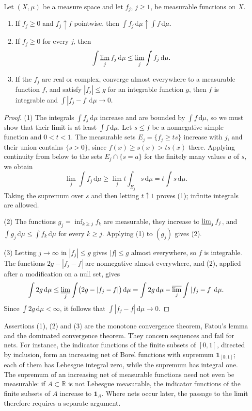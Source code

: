 \begin{proposition}\label{prop:integral-limits}
Let $(X,\mu)$ be a measure space and let $f_j$, $j\geq1$, be measurable functions on $X$.
\begin{enumerate}
\item If $f_j\geq0$ and $f_j\uparrow f$ pointwise, then $\int f_j\,\mathrm d\mu\uparrow\int f\,\mathrm d\mu$.
\item If $f_j\geq0$ for every $j$, then
\[
 \int\varliminf_j f_j\,\mathrm d\mu\leq\varliminf_j\int f_j\,\mathrm d\mu.
\]
\item If the $f_j$ are real or complex, converge almost everywhere to a measurable function $f$, and satisfy $|f_j|\leq g$ for an integrable function $g$, then $f$ is integrable and $\int|f_j-f|\,\mathrm d\mu\to0$.
\end{enumerate}
\end{proposition}
\begin{proof}
(1) The integrals $\int f_j\,\mathrm d\mu$ increase and are bounded by $\int f\,\mathrm d\mu$, so we must show that their limit is at least $\int f\,\mathrm d\mu$. Let $s\leq f$ be a nonnegative simple function and $0<t<1$. The measurable sets $E_j=\{f_j\geq ts\}$ increase with $j$, and their union contains $\{s>0\}$, since $f(x)\geq s(x)>ts(x)$ there. Applying continuity from below to the sets $E_j\cap\{s=a\}$ for the finitely many values $a$ of $s$, we obtain
\[
 \lim_j\int f_j\,\mathrm d\mu\geq\lim_jt\int_{E_j}s\,\mathrm d\mu=t\int s\,\mathrm d\mu.
\]
Taking the supremum over $s$ and then letting $t\uparrow1$ proves (1); infinite integrals are allowed.

(2) The functions $g_j=\inf_{k\geq j}f_k$ are measurable, they increase to $\varliminf_jf_j$, and $\int g_j\,\mathrm d\mu\leq\int f_k\,\mathrm d\mu$ for every $k\geq j$. Applying (1) to $(g_j)$ gives (2).

(3) Letting $j\to\infty$ in $|f_j|\leq g$ gives $|f|\leq g$ almost everywhere, so $f$ is integrable. The functions $2g-|f_j-f|$ are nonnegative almost everywhere, and (2), applied after a modification on a null set, gives
\[
 \int2g\,\mathrm d\mu\leq\varliminf_j\int\bigl(2g-|f_j-f|\bigr)\,\mathrm d\mu=\int2g\,\mathrm d\mu-\varlimsup_j\int|f_j-f|\,\mathrm d\mu.
\]
Since $\int2g\,\mathrm d\mu<\infty$, it follows that $\int|f_j-f|\,\mathrm d\mu\to0$.
\end{proof}

Assertions (1), (2) and (3) are the monotone convergence theorem, Fatou's lemma and the dominated convergence theorem. They concern sequences and fail for nets. For instance, the indicator functions of the finite subsets of $[0,1]$, directed by inclusion, form an increasing net of Borel functions with supremum $\mathbf1_{[0,1]}$; each of them has Lebesgue integral zero, while the supremum has integral one. The supremum of an increasing net of measurable functions need not even be measurable: if $A\subset\mathbb R$ is not Lebesgue measurable, the indicator functions of the finite subsets of $A$ increase to $\mathbf1_A$. Where nets occur later, the passage to the limit therefore requires a separate argument.

